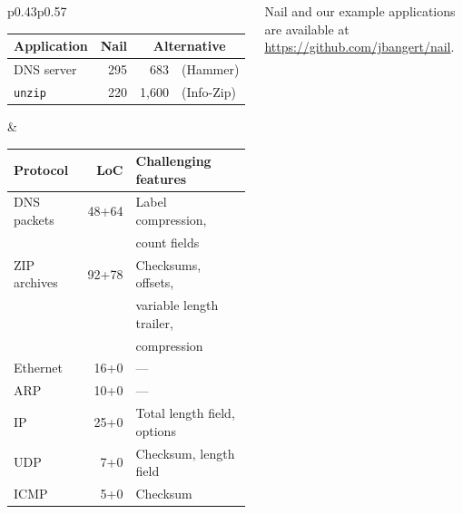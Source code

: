 \documentclass[25pt, a0paper, portrait, margin=0mm, innermargin=15mm,
blockverticalspace=10mm, colspace=15mm, subcolspace=8mm]{tikzposter}
\begin{document}
\begin{columns}
{\begin{tabular}{p{0.43\linewidth}p{0.57\linewidth}}
\begin{minipage}[t]{0.43\linewidth}
\begin{tabular}{lrr@{~}l}
\midrule
\textbf{Application}
  & \textbf{Nail}
  & \multicolumn{2}{c}{\textbf{Alternative}} \\
\midrule
DNS server
  & 295
  & 683
  & (Hammer) \\


\texttt{unzip}
  & 220
  & 1,600
  & (Info-Zip) \\
\bottomrule
\end{tabular}
\end{minipage}&
\vspace{0pt}\begin{minipage}{0.57\linewidth}

\begin{tabular}[t]{lrl}
\toprule
\textbf{Protocol} & \textbf{LoC} & \textbf{Challenging features} \\ 
\midrule
DNS packets & 48+64 & Label compression,\\
  & & count fields \\
ZIP archives & 92+78 & Checksums, offsets, \\ 
  & & variable length trailer, \\
  & & compression \\
Ethernet  & 16+0\phantom{0} & --- \\
ARP       & 10+0\phantom{0} & --- \\
IP        & 25+0\phantom{0} & Total length field, options \\
UDP       &  7+0\phantom{0} & Checksum, length field \\
ICMP      &  5+0\phantom{0} & Checksum \\
\bottomrule
\end{tabular}
\end{minipage}
\end{tabular}

Nail and our example applications are available at \url{https://github.com/jbangert/nail}.
}
  
\end{columns}
\end{document}
